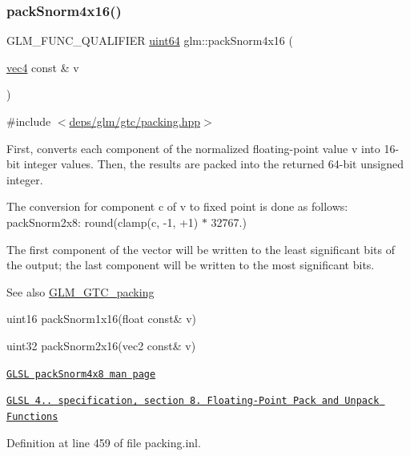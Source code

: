 \subsubsection{\texorpdfstring{pack\+Snorm4x16()}{packSnorm4x16()}}
{\footnotesize\ttfamily G\+L\+M\+\_\+\+F\+U\+N\+C\+\_\+\+Q\+U\+A\+L\+I\+F\+I\+ER \hyperlink{group__gtc__type__precision_gae3632bf9b37da66233d78930dd06378a}{uint64} glm\+::pack\+Snorm4x16 (\begin{DoxyParamCaption}\item[{\hyperlink{group__core__types_ga5881b1b022d7fd1b7218f5916532dd02}{vec4} const \&}]{v }\end{DoxyParamCaption})}



{\ttfamily \#include $<$\hyperlink{gtc_2packing_8hpp}{deps/glm/gtc/packing.\+hpp}$>$}

First, converts each component of the normalized floating-\/point value v into 16-\/bit integer values. Then, the results are packed into the returned 64-\/bit unsigned integer.

The conversion for component c of v to fixed point is done as follows\+: pack\+Snorm2x8\+: round(clamp(c, -\/1, +1) $\ast$ 32767.)

The first component of the vector will be written to the least significant bits of the output; the last component will be written to the most significant bits.

\begin{DoxySeeAlso}{See also}
\hyperlink{group__gtc__packing}{G\+L\+M\+\_\+\+G\+T\+C\+\_\+packing} 

uint16 pack\+Snorm1x16(float const\& v) 

uint32 pack\+Snorm2x16(vec2 const\& v) 

\href{http://www.opengl.org/sdk/docs/manglsl/xhtml/packSnorm4x8.xml}{\tt G\+L\+SL pack\+Snorm4x8 man page} 

\href{http://www.opengl.org/registry/doc/GLSLangSpec.4.20.8.pdf}{\tt G\+L\+SL 4.. specification, section 8. Floating-\/\+Point Pack and Unpack Functions} 
\end{DoxySeeAlso}


Definition at line 459 of file packing.\+inl.

\mbox{\label{group__gtc__packing_gaf656d8862628f96b20de7a36eaa1fe56}} 
